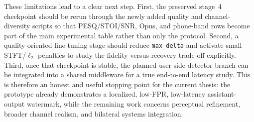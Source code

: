 These limitations lead to a clear next step. First, the preserved stage~4 checkpoint should be rerun through the newly added quality and channel-diversity scripts so that PESQ/STOI/SNR, Opus, and phone-band rows become part of the main experimental table rather than only the protocol. Second, a quality-oriented fine-tuning stage should reduce \texttt{max\_delta} and activate small STFT/$\ell_2$ penalties to study the fidelity-versus-recovery trade-off explicitly. Third, once that checkpoint is stable, the planned user-side detector branch can be integrated into a shared middleware for a true end-to-end latency study. This is therefore an honest and useful stopping point for the current thesis: the prototype already demonstrates a localized, low-FPR, low-latency assistant-output watermark, while the remaining work concerns perceptual refinement, broader channel realism, and bilateral systems integration.

\FloatBarrier

